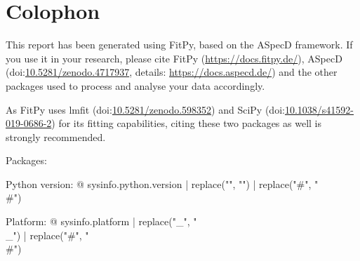 \section*{Colophon}

This report has been generated using FitPy, based on the ASpecD framework. If you use it in your research, please cite FitPy (\url{https://docs.fitpy.de/}), ASpecD (doi:\href{https://doi.org/10.5281/zenodo.4717937}{10.5281/zenodo.4717937}, details: \url{https://docs.aspecd.de/}) and the other packages used to process and analyse your data accordingly.

As FitPy uses lmfit (doi:\href{https://doi.org/10.5281/zenodo.598352}{10.5281/zenodo.598352}) and SciPy (doi:\href{https://doi.org/10.1038/s41592-019-0686-2}{10.1038/s41592-019-0686-2}) for its fitting capabilities, citing these two packages as well is strongly recommended.

Packages: %


Python version: {@ sysinfo.python.version | replace("\n", "") | replace("#", "\\#") }

Platform: {@ sysinfo.platform | replace("_", "\\_") | replace("#", "\\#") }
